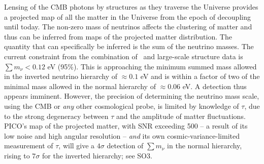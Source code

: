 \documentclass[PICOReport.tex]{subfiles}
\begin{document}
Lensing of the CMB photons by structures as they traverse the Universe provides a projected map of all the matter in the Universe from the epoch of decoupling until today.  The non-zero mass of neutrinos affects the clustering of matter and thus can be inferred from maps of the projected matter distribution. The quantity that can specifically be inferred is the sum of the neutrino masses.  The current constraint from the combination of \planck\ and large-scale structure data is $\sum m_{\nu} < 0.12$ eV (95\%).  This is approaching the minimum summed mass allowed in the inverted neutrino hierarchy of $\approx 0.1$ eV and is within a factor of two of the minimal mass allowed in the normal hierarchy of $\approx 0.06$ eV.  A detection thus appears imminent.  However, the precision of determining the neutrino mass scale, using the CMB or {\it any} other cosmological probe, is limited by knowledge of $\tau$, due to the strong degeneracy between $\tau$ and the amplitude of matter fluctuations.  PICO's map of the projected matter, with \ac{SNR} exceeding 500 -- a result of its low noise and high angular resolution -- {\it and} its own cosmic-variance-limited measurement of $\tau$, will give a $4\sigma$ detection of $\sum m_{\nu}$ in the normal hierarchy, rising to $7\sigma$ for the inverted hierarchy; see SO3. 

\end{document}
